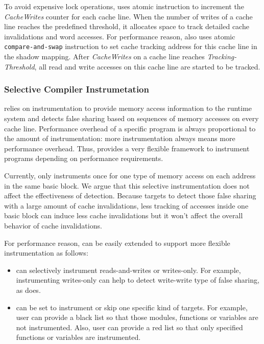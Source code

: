To avoid expensive lock operations, \Predator{} uses atomic instruction to increment 
the {\it CacheWrites} counter for each cache line. 
When the number of writes of a cache line reaches the predefined threshold,
it allocates space to track detailed cache invalidations and word accesses.
For performance reason, \Predator{} also 
uses atomic \texttt{compare-and-swap} instruction to set cache tracking address for this cache line in
the shadow mapping.
After {\it CacheWrites} on a cache line reaches {\it Tracking-Threshold}, 
all read and write accesses on this cache line are started to be tracked.


\subsubsection{Selective Compiler Instrumetation}
\Predator{} relies on instrumentation to provide memory access information to the runtime system 
and detects false sharing based on sequences of memory accesses on every cache line. 
Performance overhead of a specific program is always proportional to 
the amount of instrumentation: more 
instrumentation always means more performance overhead. 
Thus, \Predator{} provides a very flexible framework to instrument programs 
depending on performance requirements. 

Currently, \Predator{} only instruments once for one type of memory access on each address 
in the same basic block. 
We argue that this selective instrumentation does not affect the effectiveness of detection. 
Because \Predator{} targets to detect those false sharing with a large amount of cache invalidations,
less tracking of accesses inside one basic block can induce less cache invalidations 
but it won't affect the overall behavior of cache invalidations. 

For performance reason, 
\Predator{} can be easily extended to support more flexible instrumentation as follows:
\begin{itemize}
\item
\Predator{} can selectively instrument reads-and-writes or writes-only. 
For example, instrumenting writes-only can help to detect write-write type of false sharing, 
as \Sheriff{} does. 
\item
\Predator{} can be set to instrument or skip one specific kind of targets. 
For example, user can provide a black list so that those modules,
functions or variables are not instrumented. 
Also, user can provide a red list so that only specified functions or variables are instrumented. 
\end{itemize}


